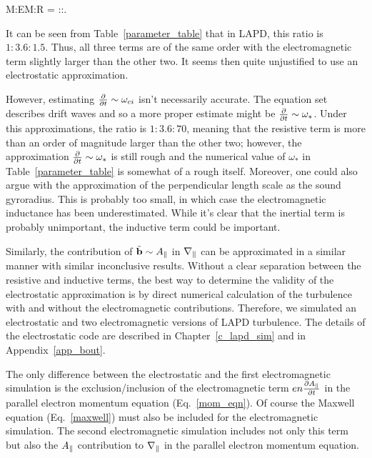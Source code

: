 \beq
\label{adiabatic_ratio}
M:EM:R = \fmei:\beta:. 
\eeq

It can be seen from Table~\ref{parameter_table} that in LAPD, this ratio is 
$1:3.6:1.5$. Thus, all three terms are of the same order with the electromagnetic term slightly larger than the other two. It seems then quite unjustified to use an electrostatic
approximation. 

However, estimating $\frac{\partial}{\partial t} \sim \omega_{ci}$ isn't necessarily accurate. The equation set describes drift waves and so a more proper estimate might be
$\frac{\partial}{\partial t} \sim \omega_{*}$. Under this approximations, the ratio is $1:3.6:70$, meaning that the resistive term is more than an order of magnitude larger than the other two; however, the 
approximation $\frac{\partial}{\partial t} \sim \omega_{*}$ is still rough and the numerical value of $\omega_{*}$ in Table~\ref{parameter_table} is somewhat of a rough itself. 
Moreover, one could also argue with the approximation of the perpendicular length scale as the sound gyroradius. 
This is probably too small, in which case the electromagnetic inductance has been underestimated. While it's clear that
the inertial term is probably unimportant, the inductive term could be important. 

Similarly, the contribution of $\tilde{{\bf b}} \sim A_\parallel$ in $\nabla_\parallel$ can be approximated in a similar manner with similar inconclusive results. 
Without a clear separation between the resistive and inductive terms, the best way to determine the validity of
the electrostatic approximation is by direct numerical calculation of the turbulence with and without the electromagnetic contributions. 
Therefore, we simulated an electrostatic and two electromagnetic versions of LAPD turbulence. 
The details of the electrostatic code are described in Chapter~\ref{c_lapd_sim} and in Appendix~\ref{app_bout}.

The only difference between the electrostatic and the first electromagnetic simulation is the exclusion/inclusion of the electromagnetic term $e n \frac{\partial A_\parallel}{\partial t}$ 
in the parallel electron momentum equation (Eq.~\ref{mom_eqn}). Of course the Maxwell equation
(Eq.~\ref{maxwell}) must also be included for the electromagnetic simulation. The second electromagnetic simulation includes not only this term
 but also the $A_\parallel$ contribution to $\nabla_\parallel$ in the parallel electron momentum equation.

